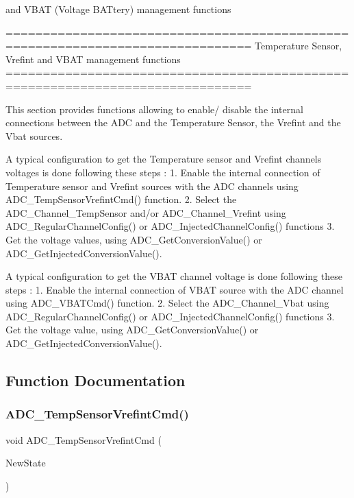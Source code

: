and V\+B\+AT (Voltage B\+A\+Ttery) management functions \begin{DoxyVerb} ===============================================================================
               Temperature Sensor, Vrefint and VBAT management functions
 ===============================================================================  

  This section provides functions allowing to enable/ disable the internal 
  connections between the ADC and the Temperature Sensor, the Vrefint and the
  Vbat sources.
     
  A typical configuration to get the Temperature sensor and Vrefint channels 
  voltages is done following these steps :
   1. Enable the internal connection of Temperature sensor and Vrefint sources 
      with the ADC channels using ADC_TempSensorVrefintCmd() function. 
   2. Select the ADC_Channel_TempSensor and/or ADC_Channel_Vrefint using 
      ADC_RegularChannelConfig() or  ADC_InjectedChannelConfig() functions 
   3. Get the voltage values, using ADC_GetConversionValue() or  
      ADC_GetInjectedConversionValue().

  A typical configuration to get the VBAT channel voltage is done following 
  these steps :
   1. Enable the internal connection of VBAT source with the ADC channel using 
      ADC_VBATCmd() function. 
   2. Select the ADC_Channel_Vbat using ADC_RegularChannelConfig() or  
      ADC_InjectedChannelConfig() functions 
   3. Get the voltage value, using ADC_GetConversionValue() or  
      ADC_GetInjectedConversionValue().\end{DoxyVerb}
 

\subsection{Function Documentation}
\mbox{\label{group__ADC__Group3_ga848682e2d7d3de9f8cf03ffa4c11f0b5}} 
\subsubsection{A\+D\+C\+\_\+\+Temp\+Sensor\+Vrefint\+Cmd()}
{\footnotesize\ttfamily void A\+D\+C\+\_\+\+Temp\+Sensor\+Vrefint\+Cmd (\begin{DoxyParamCaption}\item[{\textbf{ Functional\+State}}]{New\+State }\end{DoxyParamCaption})}



